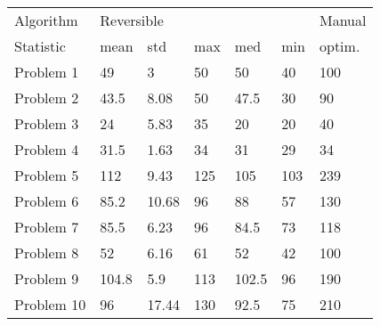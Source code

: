 \begin{tabular}{lllllll}
\toprule
Algorithm & \multicolumn{5}{l}{Reversible} & Manual \\
Statistic &       mean &    std &  max &    med &  min & optim. \\
\midrule
Problem 1  &         49 &      3 &   50 &     50 &   40 &    100 \\
Problem 2  &       43.5 &   8.08 &   50 &   47.5 &   30 &     90 \\
Problem 3  &         24 &   5.83 &   35 &     20 &   20 &     40 \\
Problem 4  &       31.5 &   1.63 &   34 &     31 &   29 &     34 \\
Problem 5  &        112 &   9.43 &  125 &    105 &  103 &    239 \\
Problem 6  &       85.2 &  10.68 &   96 &     88 &   57 &    130 \\
Problem 7  &       85.5 &   6.23 &   96 &   84.5 &   73 &    118 \\
Problem 8  &         52 &   6.16 &   61 &     52 &   42 &    100 \\
Problem 9  &      104.8 &    5.9 &  113 &  102.5 &   96 &    190 \\
Problem 10 &         96 &  17.44 &  130 &   92.5 &   75 &    210 \\
\bottomrule
\end{tabular}
